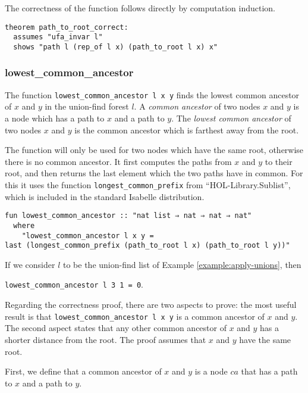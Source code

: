 The correctness of the function follows directly by computation induction.

\begin{lstlisting}
theorem path_to_root_correct:
  assumes "ufa_invar l"
  shows "path l (rep_of l x) (path_to_root l x) x"
\end{lstlisting}

\subsubsection{lowest\_common\_ancestor}

The function \lstinline{lowest_common_ancestor l x y} finds the lowest common ancestor of $x$ and $y$ in the union-find forest $l$.
A \emph{common ancestor} of two nodes $x$ and $y$ is a node which has a path to $x$ and a path to $y$.
The \emph{lowest common ancestor} of two nodes $x$ and $y$ is the common ancestor which is farthest away from the root.

The function will only be used for two nodes which have the same root, otherwise there is no common ancestor. It first computes the paths from $x$ and $y$ to their root, and then returns the last element which the two paths have in common. For this it uses the function \lstinline{longest_common_prefix} from ``HOL-Library.Sublist'', which is included in the standard Isabelle distribution.

\begin{lstlisting}
fun lowest_common_ancestor :: "nat list ⇒ nat ⇒ nat ⇒ nat"
  where
    "lowest_common_ancestor l x y =
last (longest_common_prefix (path_to_root l x) (path_to_root l y))"
\end{lstlisting}

\begin{exmp}
If we consider $l$ to be the union-find list of Example \ref{example:apply-unions}, then

\lstinline|lowest_common_ancestor l 3 1 = 0|.
\end{exmp}

Regarding the correctness proof, there are two aspects to prove: the most useful result is that \lstinline{lowest_common_ancestor l x y} is a common ancestor of $x$ and $y$. The second aspect states that any other common ancestor of $x$ and $y$ has a shorter distance from the root. The proof assumes that $x$ and $y$ have the same root.

First, we define that a common ancestor of $x$ and $y$ is a node $ca$ that has a path to $x$ and a path to $y$.

